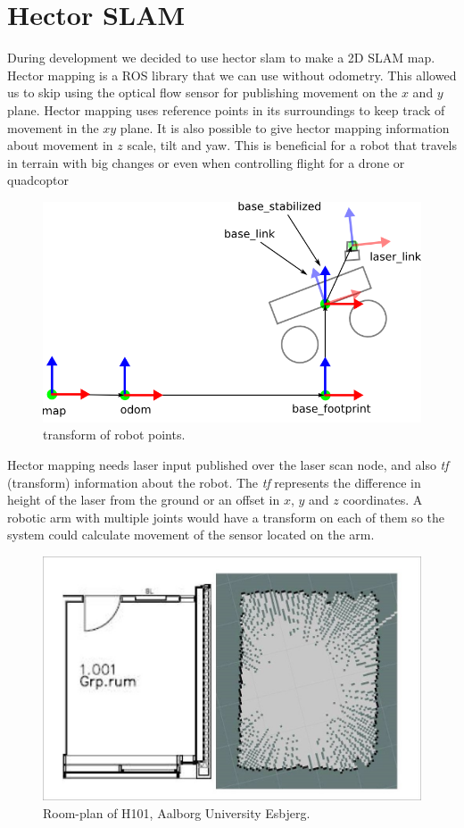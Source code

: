 \clearpage
\section{Hector SLAM}
During development we decided to use hector slam to make a 2D SLAM map. Hector mapping is a ROS library that we can use without odometry.\cite{hectormapping}
This allowed us to skip using the optical flow sensor for publishing movement on the $x$ and $y$ plane. Hector mapping uses reference points in its surroundings to keep track of movement in the $xy$ plane. It is also possible to give hector mapping information about movement in $z$ scale, tilt and yaw. This is beneficial for a robot that travels in terrain with big changes or even when controlling flight for a drone or quadcoptor

\begin{figure}[H]
	\centering
	\includegraphics[width=.5\linewidth]{images/tf.png}
	\caption{transform of robot points.\cite{tfrobot}}
\end{figure}

Hector mapping needs laser input published over the laser scan node, and also \textit{tf} (transform) information about the robot. The \textit{tf} represents the difference in height of the laser from the ground or an offset in $x$, $y$ and $z$ coordinates. A robotic arm with multiple joints would have a transform on each of them so the system could calculate movement of the sensor located on the arm.

\begin{figure}[H]
	\centering
	\includegraphics[width=.5\linewidth]{images/compare.jpg}
	\caption{Room-plan of H101, Aalborg University Esbjerg.}
\end{figure}

